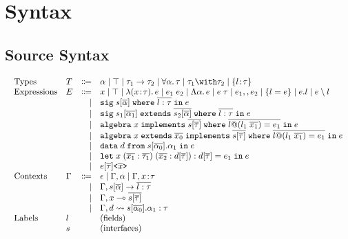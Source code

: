 \documentclass[a4paper]{article}
\begin{document}
\section{Syntax}

\subsection{Source Syntax}

\begin{displaymath}
    \begin{array}{l}
      \begin{array}{llrl}
        \text{Types}
        & T & \Coloneqq & \alpha \mid \top \mid \tau_1 \to \tau_2 \mid \for \alpha \tau \mid \tau_1 \andop \tau_2 \mid \recty l \tau \\
        \text{Expressions}
        & E & \Coloneqq & x \mid \top \mid \lam x \tau e \mid \app {e_1} {e_2} \mid \blam \alpha e \mid \tapp e \tau \mid e_1 \mergeop e_2 \mid \reccon l e \mid e.l \mid e \restrictop l \\
        &   & \mid & \sig s \alpha l \tau e \\
        &   & \mid & \sigext {s_1} {\alpha_1} {s_2} \alpha l \tau e \\
        &   & \mid & \alg x s \tau l {l_1} {x_1} {e_1} e \\
        &   & \mid & \algext x {x_0} s \tau l {l_1} {x_1} {e_1} e \\
        &   & \mid & \data d s {\alpha_0} {\alpha_1} e \\
        &   & \mid & \letexpr {x \; (\overline{x_1} : \overline{\tau_1}) \; (\overline{x_2} : d[\overline{\tau}]) : d[\overline{\tau}]} {e_1} e \\
        &   & \mid & e[\overline{\tau}]\texttt{<}\overline{x}\texttt{>} \\
        \text{Contexts} & \Gamma & \Coloneqq & \epsilon \mid \Gamma, \alpha \mid \Gamma, x \hast \tau \\
        &   & \mid & \Gamma, s {[} \overline{\alpha} {]}\to\overline{l:\tau} \\
        &   & \mid & \Gamma, x \multimap \overline{s[\overline{\tau}]} \\
        &   & \mid & \Gamma, d \rightsquigarrow s[\overline{\alpha_0}].\alpha_1 : \tau \\
        \text{Labels} & l &  & \text{(fields)} \\
        & s &  & \text{(interfaces)} \\

\end{array}
\end{array}
\end{displaymath}
\end{document}
